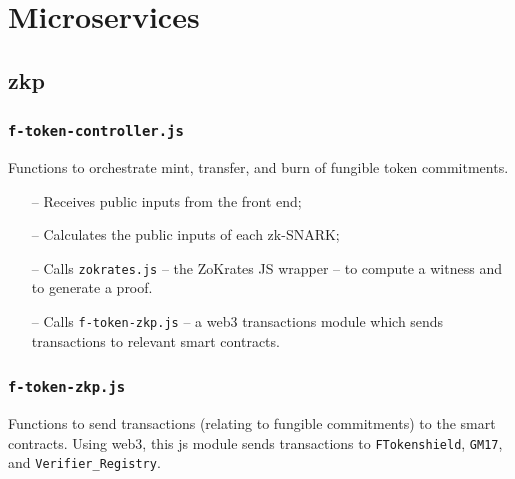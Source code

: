 \documentclass{article}
\begin{document}



\newpage
\section{Microservices}
\label{sec:microservices}
\secttoc

\subsection{zkp}
\label{sec:zkp}

\subsubsection{\texttt{f-token-controller.js}}
\label{sec:f-token-controller}
Functions to orchestrate mint, transfer, and burn of fungible token commitments.
\begin{itemize}
  \item[--] Receives public inputs from the front end;
  \item[--] Calculates the public inputs of each zk-SNARK;
  \item[--] Calls \texttt{zokrates.js} -- the ZoKrates JS wrapper -- to compute a witness and to generate a proof.
  \item[--] Calls \texttt{f-token-zkp.js} -- a web3 transactions module which sends transactions to relevant smart contracts.
\end{itemize}

\subsubsection{\texttt{f-token-zkp.js}}
\label{sec:f-token-zkp}
Functions to send transactions (relating to fungible commitments) to the smart contracts. Using web3, this js module sends transactions to \texttt{FTokenshield}, \texttt{GM17}, and \texttt{Verifier\_Registry}.
\end{document}
